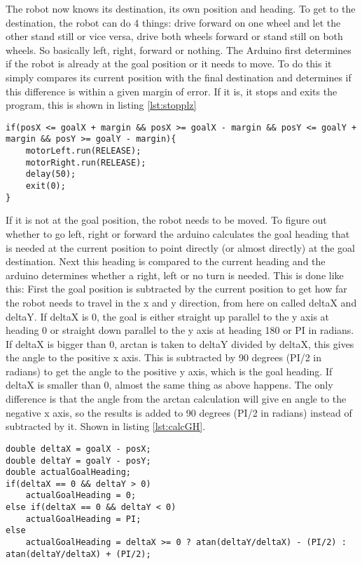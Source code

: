 The robot now knows its destination, its own position and heading. To get to the destination, the robot can do 4 things: drive forward on one wheel and let the other stand still or vice versa, drive both wheels forward or stand still on both wheels. So basically left, right, forward or nothing. The Arduino first determines if the robot is already at the goal position or it needs to move. To do this it simply compares its current position with the final destination and determines if this difference is within a given margin of error. If it is, it stops and exits the program, this is shown in listing \ref{lst:stopplz}

\begin{lstlisting}[caption={If-statement to check if the robot should stop}, label={lst:stopplz}]
if(posX <= goalX + margin && posX >= goalX - margin && posY <= goalY + margin && posY >= goalY - margin){
	motorLeft.run(RELEASE);
	motorRight.run(RELEASE);
	delay(50);
	exit(0);
} 
\end{lstlisting}

If it is not at the goal position, the robot needs to be moved. To figure out whether to go left, right or forward the arduino calculates the goal heading that is needed at the current position to point directly (or almost directly) at the goal destination. Next this heading is compared to the current heading and the arduino determines whether a right, left or no turn is needed. This is done like this:
First the goal position is subtracted by the current position to get how far the robot needs to travel in the x and y direction, from here on called deltaX and deltaY. \newline
If deltaX is 0, the goal is either straight up parallel to the y axis at heading 0 or straight down parallel to the y axis at heading 180 or PI in radians. \newline
If deltaX is bigger than 0, arctan is taken to deltaY divided by deltaX, this gives the angle to the positive x axis. This is subtracted by 90 degrees (PI/2 in radians) to get the angle to the positive y axis, which is the goal heading. \newline
If deltaX is smaller than 0, almost the same thing as above happens. The only difference is that the angle from the arctan calculation will give en angle to the negative x axis, so the results is added to 90 degrees (PI/2 in radians) instead of subtracted by it. Shown in listing \ref{lst:calcGH}.

\begin{lstlisting}[caption={Part of the driveTowardsGoal function to calculate the goalHeading}, label={lst:calcGH}]
double deltaX = goalX - posX;
double deltaY = goalY - posY;
double actualGoalHeading;
if(deltaX == 0 && deltaY > 0)
	actualGoalHeading = 0;
else if(deltaX == 0 && deltaY < 0)
	actualGoalHeading = PI;
else
	actualGoalHeading = deltaX >= 0 ? atan(deltaY/deltaX) - (PI/2) : atan(deltaY/deltaX) + (PI/2);
\end{lstlisting}


